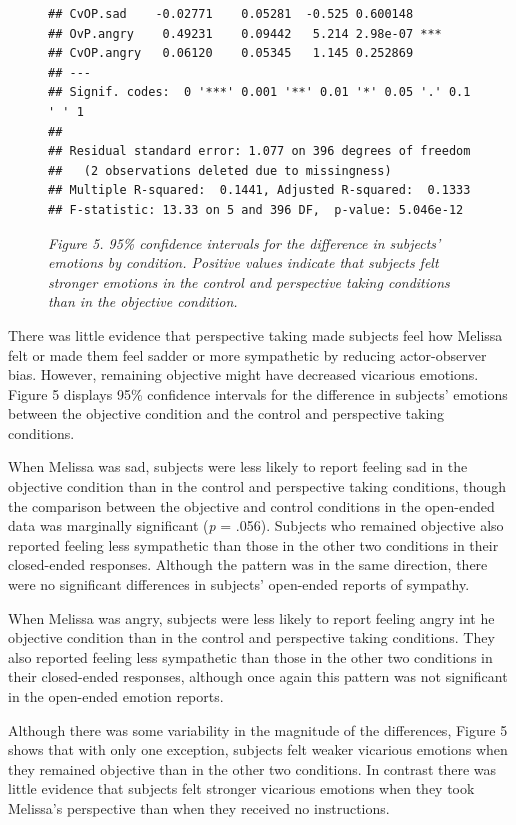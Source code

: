 \documentclass[man,a4paper,noextraspace,apacite]{apa6}\usepackage[]{graphicx}\usepackage[]{color}
\makeatletter
\newenvironment{kframe}{%
 \def\at@end@of@kframe{}%
 \ifinner\ifhmode%
  \def\at@end@of@kframe{\end{minipage}}%
  \begin{minipage}{\columnwidth}%
 \fi\fi%
 \def\FrameCommand##1{\hskip\@totalleftmargin \hskip-\fboxsep
 \colorbox{shadecolor}{##1}\hskip-\fboxsep
     \hskip-\linewidth \hskip-\@totalleftmargin \hskip\columnwidth}%
 \MakeFramed {\advance\hsize-\width
   \@totalleftmargin\z@ \linewidth\hsize
   \@setminipage}}%
 {\par\unskip\endMakeFramed%
 \at@end@of@kframe}
\newenvironment{knitrout}{}{} %
\makeatother
\begin{document}
\begin{figure}
\begin{knitrout}
\begin{kframe}
\begin{verbatim}
## CvOP.sad    -0.02771    0.05281  -0.525 0.600148    
## OvP.angry    0.49231    0.09442   5.214 2.98e-07 ***
## CvOP.angry   0.06120    0.05345   1.145 0.252869    
## ---
## Signif. codes:  0 '***' 0.001 '**' 0.01 '*' 0.05 '.' 0.1 ' ' 1
## 
## Residual standard error: 1.077 on 396 degrees of freedom
##   (2 observations deleted due to missingness)
## Multiple R-squared:  0.1441,	Adjusted R-squared:  0.1333 
## F-statistic: 13.33 on 5 and 396 DF,  p-value: 5.046e-12
\end{verbatim}
\end{kframe}
\end{knitrout}
\textit{Figure 5. 95\% confidence intervals for the difference in subjects' emotions by condition. Positive values indicate that subjects felt stronger emotions in the control and perspective taking conditions than in the objective condition.}
\end{figure}

There was little evidence that perspective taking made subjects feel how Melissa felt or made them feel sadder or more sympathetic by reducing actor-observer bias. However, remaining objective might have decreased vicarious emotions. Figure 5 displays 95\% confidence intervals for the difference in subjects' emotions between the objective condition and the control and perspective taking conditions. 

When Melissa was sad, subjects were less likely to report feeling sad in the objective condition than in the control and perspective taking conditions, though the comparison between the objective and control conditions in the open-ended data was marginally significant (\textit{p} = .056). Subjects who remained objective also reported feeling less sympathetic than those in the other two conditions in their closed-ended responses. Although the pattern was in the same direction, there were no significant differences in subjects' open-ended reports of sympathy. 

When Melissa was angry, subjects were less likely to report feeling angry int he objective condition than in the control and perspective taking conditions. They also reported feeling less sympathetic than those in the other two conditions in their closed-ended responses, although once again this pattern was not significant in the open-ended emotion reports. 

Although there was some variability in the magnitude of the differences, Figure 5 shows that with only one exception, subjects felt weaker vicarious emotions when they remained objective than in the other two conditions. In contrast there was little evidence that subjects felt stronger vicarious emotions when they took Melissa's perspective than when they received no instructions. 
\end{document}
